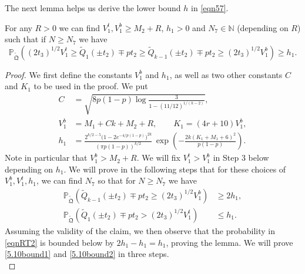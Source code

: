 \noindent The next lemma helps us derive the lower bound $h$ in \eqref{eqn57}.

\begin{lemma}\label{LemmaBP2} For any $R > 0$ we can find $V_1^t, V_1^b \geq M_2 + R$, $h_1 > 0$ and $N_7 \in \mathbb{N}$ (depending on $R$) such that if $N \geq N_7$ we have
	\begin{equation}\label{eqnRT2}
	\mathbb{P}_{\tilde{\mathfrak{Q}}} \left(  (2t_3)^{1/2} V_1^t \geq \tilde{Q}_1(\pm t_2) \mp p t_2 \geq \tilde{Q}_{k-1}(\pm t_2) \mp p t_2 \geq (2t_3)^{1/2} V_1^b  \right) \geq h_1.
	\end{equation}
	
\end{lemma}

\begin{proof}
	We first define the constants $V_1^b$ and $h_1$, as well as two other constants $C$ and $K_1$ to be used in the proof. We put
	\begin{equation}\label{5.10const}
	\begin{split}
	C &= \sqrt{8p(1-p)\log\frac{3}{1-(11/12)^{1/(k-2)}}},\\
	V_1^b &= M_1 + Ck + M_2 + R, \qquad K_1 = (4r+10)V_1^b,\\
	h_1 &=  \frac{2^{k/2-5}\big(1-2e^{-4/p(1-p)}\big)^{2k}}{(\pi p(1-p))^{k/2}}\,\exp\left(-\frac{2k(K_1+M_1+6)^2}{p(1-p)}\right).
	\end{split}
	\end{equation}
	Note in particular that $V_1^b > M_2 + R$. We will fix $V_1^t > V_1^b$ in Step 3 below depending on $h_1$. We will prove in the following steps that for these choices of  $V_1^b, V_1^t, h_1$, we can find $N_7$ so that for $N\geq N_7$ we have
	\begin{align}
	\mathbb{P}_{\tilde{\mathfrak{Q}}}\left(\tilde{Q}_{k-1}(\pm t_2) \mp pt_2 \geq (2t_3)^{1/2}V_1^b\right) &\geq 2h_1, \label{5.10bound1}\\
	\mathbb{P}_{\tilde{\mathfrak{Q}}}\left(\tilde{Q}_1(\pm t_2) \mp pt_2 > (2t_3)^{1/2}V_1^t\right) &\leq h_1. \label{5.10bound2}
	\end{align}
	Assuming the validity of the claim, we then observe that the probability in \eqref{eqnRT2} is bounded below by $2h_1 - h_1 = h_1$, proving the lemma. We will prove \eqref{5.10bound1} and \eqref{5.10bound2} in three steps.\\
	

\end{proof}
